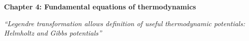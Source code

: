\renewcommand{\theequation}{4.\arabic{equation}}

\begin{frame}
\begin{center}
{\bf Chapter 4: Fundamental equations of thermodynamics}\\
\end{center}

\scriptsize

\vspace*{3cm}

\begin{center}
\textit{``Legendre transformation allows definition of useful thermodynamic potentials: Helmholtz and Gibbs potentials''}
\end{center}

\end{frame}

\scriptsize










